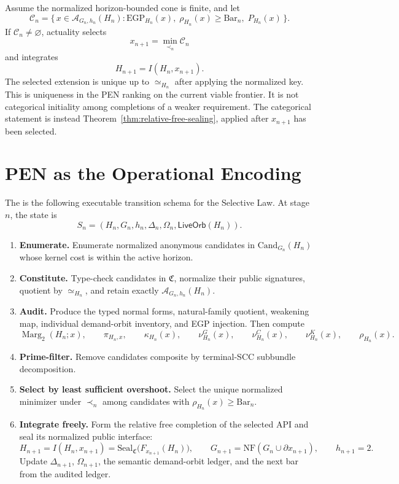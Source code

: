 \begin{theorem}
Assume the normalized horizon-bounded cone is finite, and let
\[
\mathcal{C}_n
=
\{\,x\in\mathcal{A}_{G_n,h_n}(H_n):
\mathrm{EGP}_{H_n}(x),\;
\rho_{H_n}(x)\ge\mathrm{Bar}_n,\;
P_{H_n}(x)\,\}.
\]
If \(\mathcal{C}_n\neq\varnothing\), actuality selects
\[
x_{n+1}
=
\min_{\prec_n}\mathcal{C}_n
\]
and integrates
\[
H_{n+1}=I(H_n,x_{n+1}).
\]
The selected extension is unique up to \(\simeq_{H_n}\) after applying the
normalized key. This is uniqueness in the PEN ranking on the current viable
frontier. It is not categorical initiality among completions of a weaker
requirement. The categorical statement is instead
Theorem~\ref{thm:relative-free-sealing}, applied after \(x_{n+1}\) has been
selected.
\end{theorem}

\section{PEN as the Operational Encoding}

The \PEN{} is the following executable transition schema for the Selective Law.
At stage \(n\), the state is
\[
S_n=(H_n,G_n,h_n,\Delta_n,\Omega_n,\mathsf{LiveOrb}(H_n)).
\]

\begin{enumerate}[leftmargin=*, label=\textbf{PEN\arabic*.}]
\item \textbf{Enumerate.} Enumerate normalized anonymous candidates in
\(\mathrm{Cand}_{G_n}(H_n)\) whose kernel cost is within the active horizon.

\item \textbf{Constitute.} Type-check candidates in \(\mathfrak{C}\), normalize
their public signatures, quotient by \(\simeq_{H_n}\), and retain exactly
\(\mathcal{A}_{G_n,h_n}(H_n)\).

\item \textbf{Audit.} Produce the typed normal forms, natural-family quotient,
weakening map, individual demand-orbit inventory, and EGP injection. Then
compute
\[
\operatorname{Marg}_2(H_n;x),\qquad
\pi_{H_n,x},\qquad
\kappa_{H_n}(x),\qquad
\nu^G_{H_n}(x),\qquad
\nu^C_{H_n}(x),\qquad
\nu^K_{H_n}(x),\qquad
\rho_{H_n}(x).
\]

\item \textbf{Prime-filter.} Remove candidates composite by terminal-SCC
subbundle decomposition.

\item \textbf{Select by least sufficient overshoot.} Select the unique
normalized minimizer under \(\prec_n\) among candidates with
\(\rho_{H_n}(x)\ge\mathrm{Bar}_n\).

\item \textbf{Integrate freely.} Form the relative free completion of the
selected API and seal its normalized public interface:
\[
H_{n+1}=I(H_n,x_{n+1})
=\mathrm{Seal}_{\mathfrak C}\bigl(F_{x_{n+1}}(H_n)\bigr),\qquad
G_{n+1}=\mathrm{NF}(G_n\cup\partial x_{n+1}),
\qquad
h_{n+1}=2.
\]
Update \(\Delta_{n+1}\), \(\Omega_{n+1}\), the semantic demand-orbit ledger,
and the next bar from the audited ledger.
\end{enumerate}


